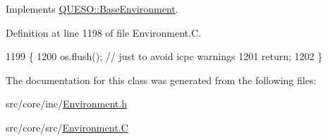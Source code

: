 Implements \hyperlink{class_q_u_e_s_o_1_1_base_environment_adba5fa84e671bb56eb001ec596729a4e}{Q\-U\-E\-S\-O\-::\-Base\-Environment}.



Definition at line 1198 of file Environment.\-C.


\begin{DoxyCode}
1199 \{
1200   os.flush(); \textcolor{comment}{// just to avoid icpc warnings}
1201   \textcolor{keywordflow}{return};
1202 \}
\end{DoxyCode}


The documentation for this class was generated from the following files\-:\begin{DoxyCompactItemize}
\item 
src/core/inc/\hyperlink{_environment_8h}{Environment.\-h}\item 
src/core/src/\hyperlink{_environment_8_c}{Environment.\-C}\end{DoxyCompactItemize}
